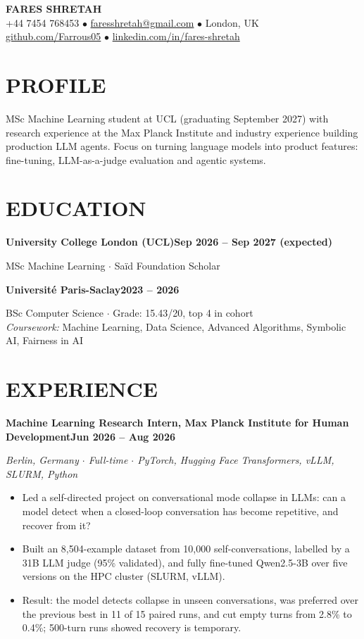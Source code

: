 \documentclass[10pt, a4paper]{article}
\newcommand{\entry}[2]{\vspace{5pt}\textbf{#1}\hfill\textbf{#2}\par}
\newcommand{\sub}[1]{\textit{#1}\par}
\begin{document}
\begin{center}
    {\huge \textbf{FARES SHRETAH}} \\[3pt]
    \small +44 7454 768453 $\bullet$ \href{mailto:faresshretah@gmail.com}{faresshretah@gmail.com} $\bullet$ London, UK \\
    \small \href{https://github.com/Farrous05}{github.com/Farrous05} $\bullet$ \href{https://www.linkedin.com/in/fares-shretah/}{linkedin.com/in/fares-shretah}
\end{center}

\section*{PROFILE}
MSc Machine Learning student at UCL (graduating September 2027) with research experience at the Max Planck Institute and industry experience building production LLM agents. Focus on turning language models into product features: fine-tuning, LLM-as-a-judge evaluation and agentic systems.

\section*{EDUCATION}
\entry{University College London (UCL)}{Sep 2026 -- Sep 2027 (expected)}
MSc Machine Learning $\cdot$ Sa\"id Foundation Scholar

\entry{Universit\'e Paris-Saclay}{2023 -- 2026}
BSc Computer Science $\cdot$ Grade: 15.43/20, top 4 in cohort \\
\textit{Coursework:} Machine Learning, Data Science, Advanced Algorithms, Symbolic AI, Fairness in AI

\section*{EXPERIENCE}
\entry{Machine Learning Research Intern, Max Planck Institute for Human Development}{Jun 2026 -- Aug 2026}
\sub{Berlin, Germany $\cdot$ Full-time $\cdot$ PyTorch, Hugging Face Transformers, vLLM, SLURM, Python}
\begin{itemize}
    \item Led a self-directed project on conversational mode collapse in LLMs: can a model detect when a closed-loop conversation has become repetitive, and recover from it?
    \item Built an 8,504-example dataset from 10,000 self-conversations, labelled by a 31B LLM judge (95\% validated), and fully fine-tuned Qwen2.5-3B over five versions on the HPC cluster (SLURM, vLLM).
    \item Result: the model detects collapse in unseen conversations, was preferred over the previous best in 11 of 15 paired runs, and cut empty turns from 2.8\% to 0.4\%; 500-turn runs showed recovery is temporary.
\end{itemize}
\end{document}
